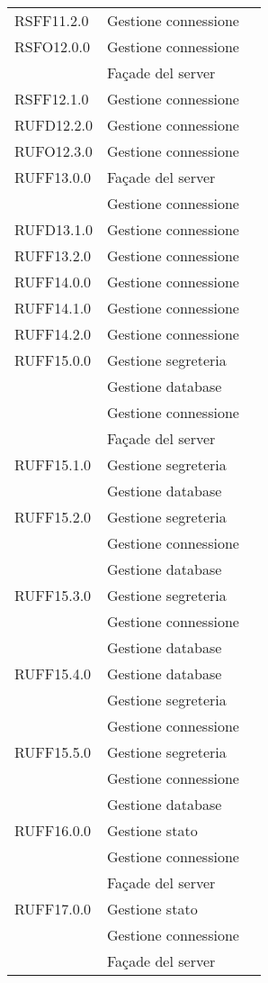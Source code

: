 \begin{center}
\begin{longtable}{lp{}l}
RSFF11.2.0 & Gestione connessione \\
RSFO12.0.0 & Gestione connessione \\
 & Façade del server \\
RSFF12.1.0 & Gestione connessione \\
RUFD12.2.0 & Gestione connessione \\
RUFO12.3.0 & Gestione connessione \\
RUFF13.0.0 & Façade del server \\
 & Gestione connessione \\
RUFD13.1.0 & Gestione connessione \\
RUFF13.2.0 & Gestione connessione \\
RUFF14.0.0 & Gestione connessione \\
RUFF14.1.0 & Gestione connessione \\
RUFF14.2.0 & Gestione connessione \\
RUFF15.0.0 & Gestione segreteria \\
 & Gestione database \\
 & Gestione connessione \\
 & Façade del server \\
RUFF15.1.0 & Gestione segreteria \\
 & Gestione database \\
RUFF15.2.0 & Gestione segreteria \\
 & Gestione connessione \\
 & Gestione database \\
RUFF15.3.0 & Gestione segreteria \\
 & Gestione connessione \\
 & Gestione database \\
RUFF15.4.0 & Gestione database \\
 & Gestione segreteria \\
 & Gestione connessione \\
RUFF15.5.0 & Gestione segreteria \\
 & Gestione connessione \\
 & Gestione database \\
RUFF16.0.0 & Gestione stato \\
 & Gestione connessione \\
 & Façade del server \\
RUFF17.0.0 & Gestione stato \\
 & Gestione connessione \\
 & Façade del server \\

\end{longtable}
\end{center}
